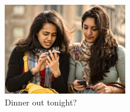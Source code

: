  \begin{figure}
   \begin{center}
     \includegraphics[width=0.48\textwidth]{images/1_01c-women.png}
   \end{center}
   \caption{Dinner out tonight?}
 \end{figure}
